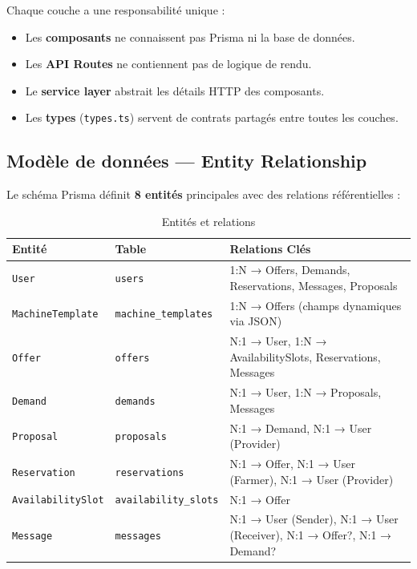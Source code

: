 \documentclass[12pt, a4paper]{article}
\begin{document}
\begin{infobox}
Chaque couche a une responsabilité unique :
\begin{itemize}
  \item Les \textbf{composants} ne connaissent pas Prisma ni la base de données.
  \item Les \textbf{API Routes} ne contiennent pas de logique de rendu.
  \item Le \textbf{service layer} abstrait les détails HTTP des composants.
  \item Les \textbf{types} (\texttt{types.ts}) servent de contrats partagés entre toutes les couches.
\end{itemize}
\end{infobox}

\subsection{Modèle de données — Entity Relationship}

Le schéma Prisma définit \textbf{8 entités} principales avec des relations référentielles :

\begin{table}[h!]
\centering
\caption{Entités et relations}
\begin{tabularx}{\textwidth}{l l X}
\toprule
\textbf{Entité} & \textbf{Table} & \textbf{Relations Clés} \\
\midrule
\texttt{User}              & \texttt{users}              & 1:N → Offers, Demands, Reservations, Messages, Proposals \\
\texttt{MachineTemplate}   & \texttt{machine\_templates} & 1:N → Offers (champs dynamiques via JSON) \\
\texttt{Offer}             & \texttt{offers}             & N:1 → User, 1:N → AvailabilitySlots, Reservations, Messages \\
\texttt{Demand}            & \texttt{demands}            & N:1 → User, 1:N → Proposals, Messages \\
\texttt{Proposal}          & \texttt{proposals}          & N:1 → Demand, N:1 → User (Provider) \\
\texttt{Reservation}       & \texttt{reservations}       & N:1 → Offer, N:1 → User (Farmer), N:1 → User (Provider) \\
\texttt{AvailabilitySlot}  & \texttt{availability\_slots}& N:1 → Offer \\
\texttt{Message}           & \texttt{messages}           & N:1 → User (Sender), N:1 → User (Receiver), N:1 → Offer?, N:1 → Demand? \\
\bottomrule
\end{tabularx}
\end{table}
\end{document}
